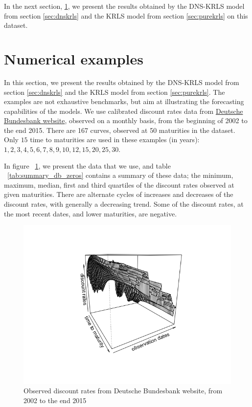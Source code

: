 In the next section, \ref{sec:numericalexamples}, we present the results obtained by the DNS-KRLS model from section \ref{sec:dnskrls} and the KRLS model from section \ref{sec:purekrls} on this dataset. 


\section{Numerical examples}
\label{sec:numericalexamples}

In this section, we present the results obtained by the DNS-KRLS model from section \ref{sec:dnskrls} and the KRLS model from section \ref{sec:purekrls}. The examples are not exhaustive benchmarks, but aim at illustrating the forecasting capabilities of the models. We use calibrated discount rates data from \textcolor{blue}{\href{http://www.bundesbank.de/Navigation/EN/Statistics/Time_series_databases/time_series_databases.html}{Deutsche Bundesbank website}}, observed on a monthly basis, from the beginning of 2002 to the end 2015. There are 167 curves, observed at 50 maturities in the dataset. Only $15$ time to maturities are used in these examples (in years): $1, 2, 3, 4, 5, 6, 7, 8, 9, 10, 12, 15, 20, 25, 30$. 

\medskip

In figure ~\ref{db_zerorates}, we present the data that we use, and table ~\ref{tab:summary_db_zeros} contains a summary of these data; the minimum, maximum, median, first and third quartiles of the discount rates observed at given maturities. There are alternate cycles of increases and decreases of the discount rates, with generally a decreasing trend. Some of the discount rates, at the most recent dates, and lower maturities, are negative.

\newpage

\begin{figure}[!htb]
\centering
\includegraphics[width=14cm]{gfx/chapter-krls-models/bundesbank_dR.png}
\caption{Observed discount rates from Deutsche Bundesbank website, from 2002 to the end 2015}
\label{db_zerorates}
\end{figure}

